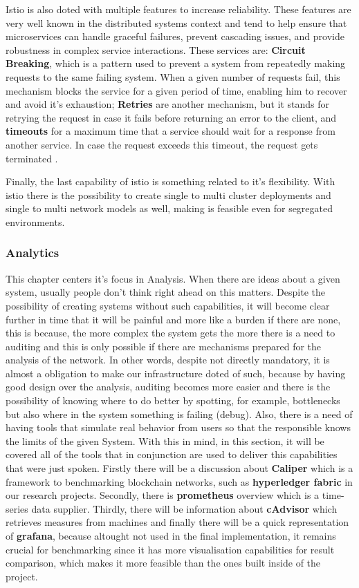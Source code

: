 Istio is also doted with multiple features to increase reliability. These features are very well known in the distributed systems context and tend to help ensure that microservices can handle graceful failures, prevent cascading issues, and provide robustness in complex service interactions. These services are: \textbf{Circuit Breaking}, which is a pattern used to prevent a system from repeatedly making requests to the same failing system. When a given number of requests fail, this mechanism blocks the service for a given period of time, enabling him to recover and avoid it's exhaustion; \textbf{Retries} are another mechanism, but it stands for retrying the request in case it fails before returning an error to the client, and \textbf{timeouts} for a maximum time that a service should wait for a response from another service. In case the request exceeds this timeout, the request gets terminated \cite{circuit-break-and-timeouts}\cite{circuit-breaking-and-retries-2}\cite{circuit-breaks-and-retries}.

Finally, the last capability of istio is something related to it's flexibility. With istio there is the possibility to create single to multi cluster deployments and single to multi network models as well, making is feasible even for segregated environments.


\subsubsection{Analytics}
This chapter centers it's focus in Analysis. When there are ideas about a given system, usually people don't think right ahead on this matters. Despite the possibility of creating systems without such capabilities, it will become clear further in time that it will be painful and more like a burden if there are none, this is because, the more complex the system gets the more there is a need to auditing and this is only possible if there are mechanisms prepared for the analysis of the network. In other words, despite not directly mandatory, it is almost a obligation to make our infrastructure doted of such, because by having good design over the analysis, auditing becomes more easier and there is the possibility of knowing where to do better by spotting, for example, bottlenecks but also where in the system something is failing (debug). Also, there is a need of having tools that simulate real behavior from users so that the responsible knows the limits of the given System. With this in mind, in this section, it will be covered all of the tools that in conjunction are used to deliver this capabilities that were just spoken. Firstly there will be a discussion about \textbf{Caliper} which is a framework to benchmarking blockchain networks, such as \textbf{hyperledger fabric} in our research projects. Secondly, there is \textbf{prometheus} overview which is a time-series data supplier. Thirdly, there will be information about \textbf{cAdvisor} which retrieves measures from machines and finally there will be a quick representation of \textbf{grafana}, because altought not used in the final implementation, it remains crucial for benchmarking since it has more visualisation capabilities for result comparison, which makes it more feasible than the ones built inside of the project.

